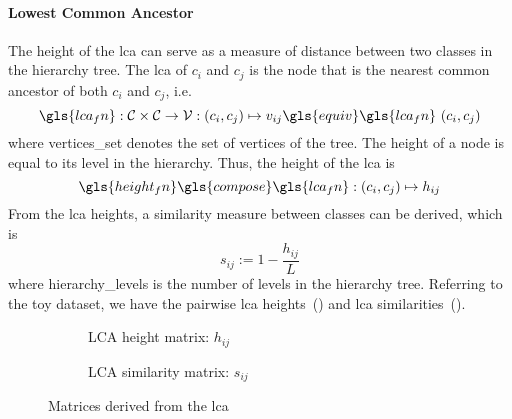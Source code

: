 \paragraph{Lowest Common Ancestor}
The height of the \acrfull{lca} can serve as a measure of distance between two classes in the hierarchy tree. The \acrshort{lca} of $c_i$ and $c_j$ is the node that is the nearest common ancestor of both $c_i$ and $c_j$, i.e.\
\begin{equation}
  \gls{lca_fn} : \mathcal{C} \times \mathcal{C} \to \mathcal{V}:
  \left(c_i, c_j\right) \mapsto v_{ij} \gls{equiv}
  \gls{lca_fn} \, \left(c_i, c_j\right)
  \label{eq:lca}
\end{equation}
where \gls{vertices_set} denotes the set of vertices of the tree. The height of a node is equal to its level in the hierarchy.
Thus, the height of the \acrshort{lca} is
\begin{equation}
  \gls{height_fn} \gls{compose} \gls{lca_fn} : \left(c_i, c_j\right) \mapsto h_{ij}
  \label{eq:lca-height}
\end{equation}
From the \acrshort{lca} heights, a similarity measure between classes can be derived, which is
\begin{equation}
  s_{ij} := 1 - \frac{h_{ij}}{L}
\end{equation}
where \gls{hierarchy_levels} is the number of levels in the hierarchy tree.
Referring to the toy dataset, we have the pairwise \acrshort{lca} heights~() and \acrshort{lca} similarities~().
\begin{figure}[htbp]
  \begin{subfigure}{0.45\textwidth}
    \caption{LCA height matrix: $h_{ij}$}
    \label{fig:03/lca-height-matrix}
  \end{subfigure}
  \begin{subfigure}{0.45\textwidth}
    \caption{LCA similarity matrix: $s_{ij}$}
    \label{fig:03/lca-similarity-matrix}
  \end{subfigure}
  \caption{Matrices derived from the \acrlong{lca}}
\end{figure}

